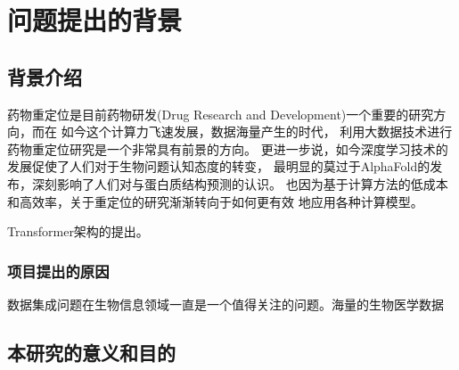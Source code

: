 \section{问题提出的背景}


\subsection{背景介绍}
药物重定位是目前药物研发(Drug Research and Development)一个重要的研究方向，而在
如今这个计算力飞速发展，数据海量产生的时代，
利用大数据技术进行药物重定位研究是一个非常具有前景的方向。
更进一步说，如今深度学习技术的发展促使了人们对于生物问题认知态度的转变，
最明显的莫过于AlphaFold的发布，深刻影响了人们对与蛋白质结构预测的认识。
也因为基于计算方法的低成本和高效率，关于重定位的研究渐渐转向于如何更有效
地应用各种计算模型。

Transformer架构的提出。

\subsubsection{项目提出的原因}
数据集成问题在生物信息领域一直是一个值得关注的问题。海量的生物医学数据


\subsection{本研究的意义和目的}

